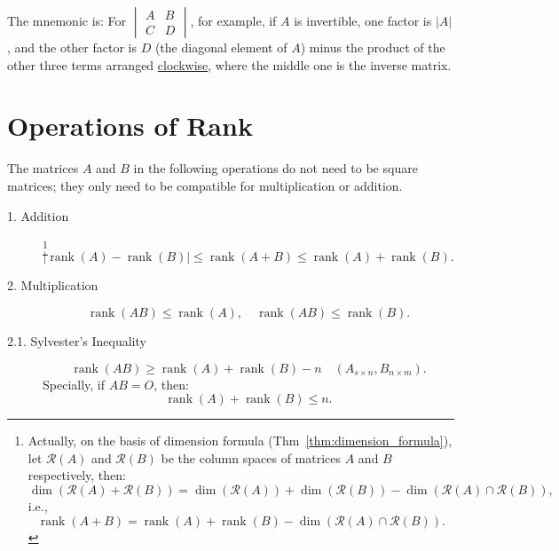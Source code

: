 \documentclass[11pt]{../../TexTemplate/elegantbook} %
\begin{document}
\begin{remark}
    The mnemonic is: 
    For \( \begin{vmatrix} A & B \\ C & D \end{vmatrix} \), for example, if \( A \) is invertible, 
    one factor is \( |A| \), and the other factor is \( D \) (the diagonal element of \( A \)) minus 
    the product of the other three terms arranged \underline{clockwise}, where the middle one is the inverse matrix.
\end{remark}




\section{Operations of Rank}
\begin{proposition}
    The matrices \( A \) and \( B \) in the following operations do not need to be square matrices; 
    they only need to be compatible for multiplication or addition.
    \begin{description}
        \item [1. Addition]\footnote{
            Actually, on the basis of dimension formula (Thm~\ref{thm:dimension_formula}),
            let \( \mathcal{R}(A) \) and \( \mathcal{R}(B) \) be the column spaces of matrices \( A \) and \( B \) respectively,
            then:
            \[
            \operatorname{dim}(\mathcal{R}(A) + \mathcal{R}(B)) = 
            \operatorname{dim}(\mathcal{R}(A)) + \operatorname{dim}(\mathcal{R}(B)) - 
            \operatorname{dim}(\mathcal{R}(A) \cap \mathcal{R}(B)),
            \]
            i.e.,
            \[
            \operatorname{rank}(A + B) = \operatorname{rank}(A) + \operatorname{rank}(B) - 
            \operatorname{dim}(\mathcal{R}(A) \cap \mathcal{R}(B)).
            \]
        }
        \[
        \left| \operatorname{rank}(A) - \operatorname{rank}(B) \right| \leqslant 
        \operatorname{rank}(A + B) \leqslant \operatorname{rank}(A) + \operatorname{rank}(B).
        \]
        \item [2. Multiplication]
        \[
        \operatorname{rank}(AB) \leqslant \operatorname{rank}(A), \quad \operatorname{rank}(AB) \leqslant \operatorname{rank}(B).
        \]
        \item[2.1. Sylvester's Inequality]
        \[
        \operatorname{rank}(AB) \geqslant \operatorname{rank}(A) + \operatorname{rank}(B) - n \quad (A_{s \times n}, B_{n \times m}).
        \]
        Specially, if \( AB = O \), then:
        \[
        \operatorname{rank}(A) + \operatorname{rank}(B) \leqslant n.
        \]


\end{description}
\end{proposition}
\end{document}
